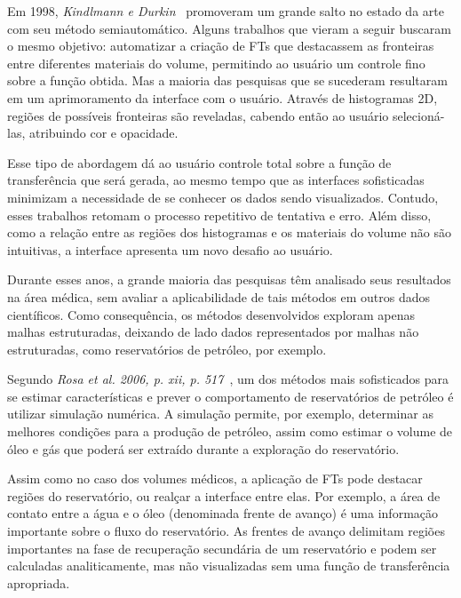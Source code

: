     Em 1998, \textit{Kindlmann e Durkin}~\cite{gordon} promoveram um grande salto no estado da arte com seu método semiautomático. Alguns trabalhos que vieram a seguir buscaram o mesmo objetivo: automatizar a criação de FTs que destacassem as fronteiras entre diferentes materiais do volume, permitindo ao usuário um controle fino sobre a função obtida. Mas a maioria das pesquisas que se sucederam resultaram em um aprimoramento da interface com o usuário. Através de histogramas 2D, regiões de possíveis fronteiras são reveladas, cabendo então ao usuário selecioná-las, atribuindo cor e opacidade.
    
    Esse tipo de abordagem dá ao usuário controle total sobre a função de transferência que será gerada, ao mesmo tempo que as interfaces sofisticadas minimizam a necessidade de se conhecer os dados sendo visualizados. Contudo, esses trabalhos retomam o processo repetitivo de tentativa e erro. Além disso, como a relação entre as regiões dos histogramas e os materiais do volume não são intuitivas, a interface apresenta um novo desafio ao usuário.
    
    Durante esses anos, a grande maioria das pesquisas têm analisado seus resultados na área médica, sem avaliar a aplicabilidade de tais métodos em outros dados científicos. Como consequência, os métodos desenvolvidos exploram apenas malhas estruturadas, deixando de lado dados representados por malhas não estruturadas, como reservatórios de petróleo, por exemplo.
    
    Segundo \textit{Rosa et al. 2006, p. xii, p. 517}~\cite{rosa}, um dos métodos mais sofisticados para se estimar características e prever o comportamento de reservatórios de petróleo é utilizar simulação numérica. A simulação permite, por exemplo, determinar as melhores condições para a produção de petróleo, assim como estimar o volume de óleo e gás que poderá ser extraído durante a exploração do reservatório.
    
    Assim como no caso dos volumes médicos, a aplicação de FTs pode destacar regiões do reservatório, ou realçar a interface entre elas. Por exemplo, a área de contato entre a água e o óleo (denominada frente de avanço) é uma informação importante sobre o fluxo do reservatório. As frentes de avanço delimitam regiões importantes na fase de recuperação secundária de um reservatório e podem ser calculadas analiticamente, mas não visualizadas sem uma função de transferência apropriada.
    
